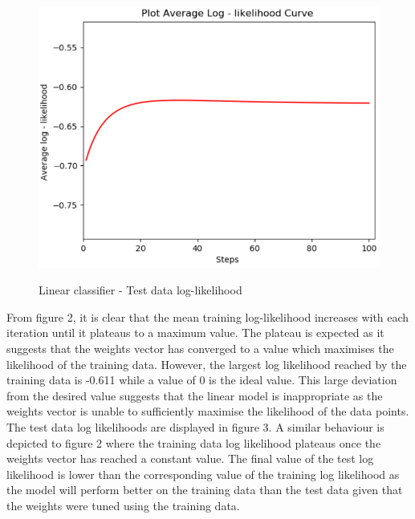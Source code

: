 \documentclass[twocolumn]{article}
\begin{document}
\begin{figure}[!htb]
	\centering\includegraphics[width=\columnwidth]{c}\\
	\caption{Linear classifier - Test data log-likelihood}\label{triangu}
\end{figure}

From figure 2, it is clear that the mean training log-likelihood increases with each iteration until it plateaus to a maximum value. The plateau is expected as it suggests that the weights vector has converged to a value which maximises the likelihood of the training data. However, the largest log likelihood reached by the training data is -0.611 while a value of 0 is the ideal value. This large deviation from the desired value suggests that the linear model is inappropriate as the weights vector is unable to sufficiently maximise the likelihood of the data points. The test data log likelihoods are displayed in figure 3. A similar behaviour is depicted to figure 2 where the training data log likelihood plateaus once the weights vector has reached a constant value. The final value of the test log likelihood is lower than the corresponding value of the training log likelihood as the model will perform better on the training data than the test data given that the weights were tuned using the training data.
\end{document}
